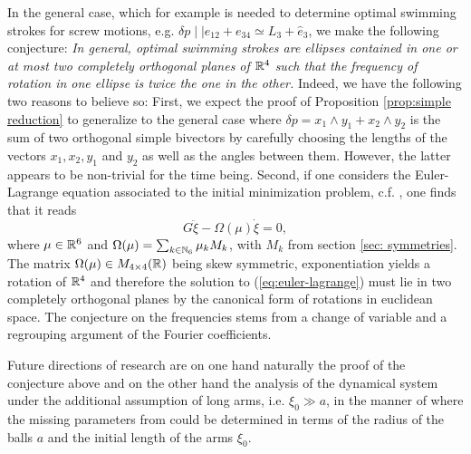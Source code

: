 In the general case, which for example is needed to determine optimal swimming strokes for screw motions, e.g. $\delta p \mid \mid e_{12} + e_{34} \simeq L_3 + \hat{e}_3$, we make the following conjecture: \emph{In general, optimal swimming strokes are ellipses contained in one or at most two completely orthogonal planes of $\mathbb{R}^4$ such that the frequency of rotation in one ellipse is twice the one in the other.} Indeed, we have the following two reasons to believe so: First, we expect the proof of Proposition \ref{prop:simple reduction} to generalize to the general case where $\delta p = x_1 \wedge y_1 + x_2 \wedge y_2$ is the sum of two orthogonal simple bivectors by carefully choosing the lengths of the vectors $x_1, x_2, y_1$ and $y_2$ as well as the angles between them. However, the latter appears to be non-trivial for the time being. Second, if one considers the Euler-Lagrange equation associated to the initial minimization problem, c.f. \cite{DeSimone2011}, one finds that it reads
\begin{equation}
\label{eq:euler-lagrange}
G \ddot{\xi} - \Omega(\mu) \dot{\xi} = 0,
\end{equation}
where $\mu \in \mathbb{R}^6$ and $\Omega(\mu) = \sum_{k \in \mathbb{N}_6} \mu_k M_k$, with $M_k$ from section \ref{sec: symmetries}. The matrix $\Omega(\mu) \in M_{4 \times 4}(\mathbb{R})$ being skew symmetric, exponentiation yields a rotation of $\mathbb{R}^4$ and therefore the solution to (\ref{eq:euler-lagrange}) must lie in two completely orthogonal planes by the canonical form of rotations in euclidean space. The conjecture on the frequencies stems from a change of variable and a regrouping argument of the Fourier coefficients.

Future directions of research are on one hand naturally the proof of the conjecture above and on the other hand the analysis of the dynamical system under the additional assumption of long arms, i.e. $\xi_0 \gg a$, in the manner of \cite{Alouges2020} where the missing parameters from \cite{Alouges2017} could be determined in terms of the radius of the balls $a$ and the initial length of the arms $\xi_0$.